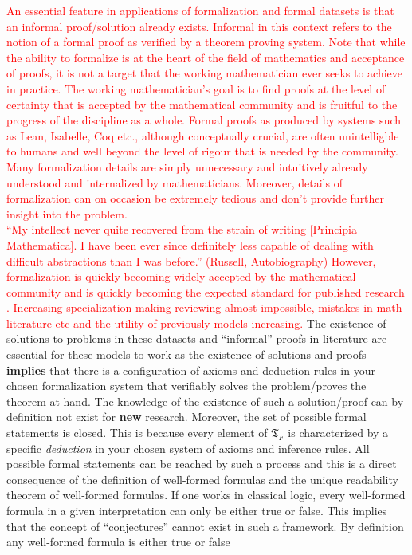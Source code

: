 \textcolor{red}{
An essential feature in applications of formalization and formal datasets is that an informal proof/solution already exists. Informal in this context refers to the notion of a formal proof as verified by a theorem proving system. Note that while the ability to formalize is at the heart of the field of mathematics and acceptance of proofs,
it is not a target that the working mathematician ever seeks to achieve in practice. The working mathematician's goal is to find proofs at the level of certainty that is accepted by the mathematical community and is fruitful to the progress of the discipline as a whole. Formal proofs as produced by systems such as Lean, Isabelle, Coq etc., although conceptually crucial, are often unintelligble to humans and well beyond the level of rigour that is needed by the community. Many formalization details are simply unnecessary and
intuitively already understood and internalized by mathematicians. Moreover, details of formalization can on occasion be extremely tedious and don't provide further insight into the problem.
\\
“My intellect never quite recovered from the strain of
writing [Principia Mathematica]. I have been ever since
definitely less capable of dealing with difficult
abstractions than I was before.” (Russell, Autobiography)
However, formalization is quickly becoming widely accepted by the mathematical community and is quickly becoming the expected standard for published research \cite{Tao, formalization_projects_to_check_shit}.
Increasing specialization making reviewing almost impossible, mistakes in math literature etc and the utility of previously models increasing.
}
The existence of solutions to problems in these datasets and ``informal'' proofs in literature are essential for these models to work as the existence of solutions and proofs \textbf{implies} that there is a configuration of axioms and deduction rules in your chosen formalization system that verifiably solves the problem/proves the theorem at hand.
The knowledge of the existence of such a solution/proof can by definition not exist for \textbf{new} research. Moreover, the set of possible formal statements is closed. This is because every element of $\mathfrak{T}_F$ is characterized by a specific \textit{deduction} in your chosen system of axioms and inference rules. All possible formal statements can be reached by such a process
and this is a direct consequence of the definition of well-formed formulas and the unique readability theorem of well-formed formulas. If one works in classical logic, every well-formed formula in a given interpretation can only be either true or false. This implies that the concept of ``conjectures'' cannot exist in such a framework. By definition any well-formed formula is either true or false

